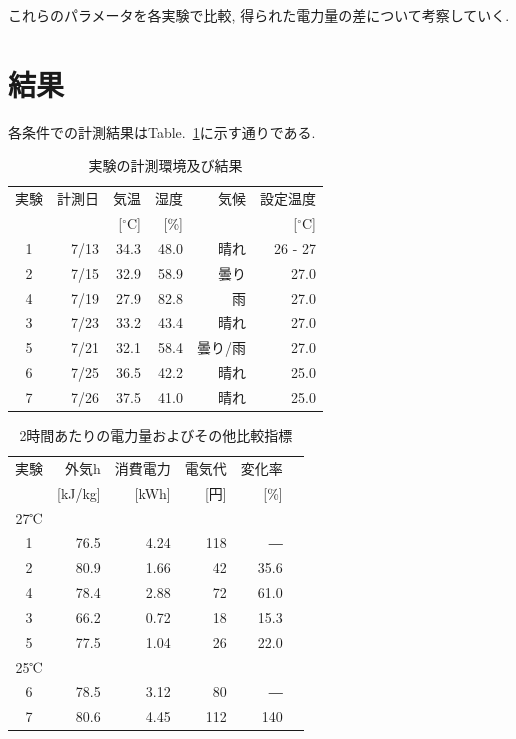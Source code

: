 \documentclass[a4j,fleqn,dvipdfmx,uplatex]{jsarticle}
\newcommand{\tableref}[1]{Table.\ \ref{#1}}
\begin{document}
これらのパラメータを各実験で比較, 得られた電力量の差について考察していく. 

\section{結果}\label{sec3}
各条件での計測結果は\tableref{table:ex}に示す通りである. 

\begin{table}[htb]
  \caption{実験の計測環境及び結果}
  \label{table:ex}
  \centering
  \begin{tabular}{crrrrr}
    \small 実験 & \small 計測日 & \small 気温 & \small 湿度 & \small 気候 & \small 設定温度 \\[-1.5mm]
     & & \small [$^\circ$C] & \small [\%] & & \small [$^\circ$C] \\
    \hline \hline
    1 & 7/13 & 34.3 & 48.0 & 晴れ & 26 - 27 \\
    2 & 7/15 & 32.9 & 58.9 & 曇り & 27.0 \\
    4 & 7/19 & 27.9 & 82.8 & 雨 & 27.0 \\
    3 & 7/23 & 33.2 & 43.4 & 晴れ & 27.0 \\
    5 & 7/21 & 32.1 & 58.4 & 曇り/雨 & 27.0 \\[2.5mm]
    6 & 7/25 & 36.5 & 42.2 & 晴れ & 25.0 \\
    7 & 7/26 & 37.5 & 41.0 & 晴れ & 25.0 \\
    \hline
  \end{tabular}
\end{table}

\begin{table}[htb]
  \caption{2時間あたりの電力量およびその他比較指標}
  \label{table:ex2}
  \centering
  \begin{tabular}{crrrrr}
    \small 実験 &   \small 外気h & \small 消費電力 & \small 電気代 & \small 変化率\\[-1.5mm]
    & \small [kJ/kg] & \small [kWh] & \small [円] & \small [\%] \\
    \hline \hline
    27℃ \\
    \hline
    1 & 76.5 & 4.24 & 118 & ― \\
    2 & 80.9 & 1.66 & 42 & 35.6 \\
    4 & 78.4 & 2.88 & 72 & 61.0 \\
    3 & 66.2 & 0.72 & 18 & 15.3 \\
    5 & 77.5 & 1.04 & 26 & 22.0 \\[2mm]
    25℃ \\
    \hline
    6 & 78.5 & 3.12 & 80 & ― \\
    7 & 80.6 & 4.45 & 112  & 140 \\
    \hline
  \end{tabular}
\end{table}
\end{document}

